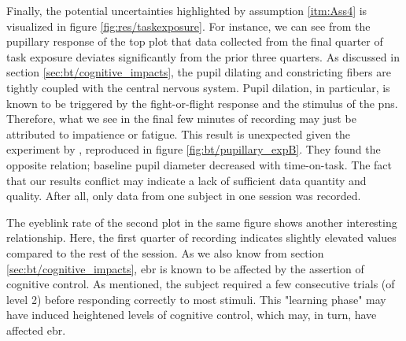 Finally, the potential uncertainties highlighted by assumption \ref{itm:Ass4} is visualized in figure \ref{fig:res/taskexposure}. For instance, we can see from the pupillary response of the top plot that data collected from the final quarter of task exposure deviates significantly from the prior three quarters. As discussed in section \ref{sec:bt/cognitive_impacts}, the pupil dilating and constricting fibers are tightly coupled with the central nervous system. Pupil dilation, in particular, is known to be triggered by the fight-or-flight response and the stimulus of the \acrshort{pns}. Therefore, what we see in the final few minutes of recording may just be attributed to impatience or fatigue. This result is unexpected given the experiment by \textcite{hopstaken2015}, reproduced in figure \ref{fig:bt/pupillary_expB}. They found the opposite relation; baseline pupil diameter decreased with time-on-task. The fact that our results conflict may indicate a lack of sufficient data quantity and quality. After all, only data from one subject in one session was recorded.

The eyeblink rate of the second plot in the same figure shows another interesting relationship. Here, the first quarter of recording indicates slightly elevated values compared to the rest of the session. As we also know from section \ref{sec:bt/cognitive_impacts}, \acrshort{ebr} is known to be affected by the assertion of cognitive control. As mentioned, the subject required a few consecutive trials (of level 2) before responding correctly to most stimuli. This "learning phase" may have induced heightened levels of cognitive control, which may, in turn, have affected \acrshort{ebr}.